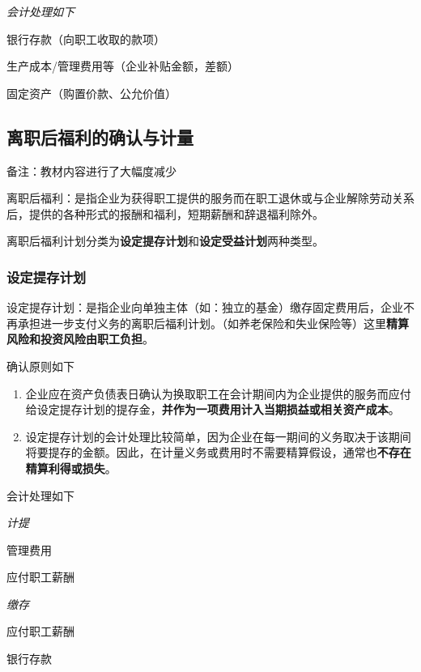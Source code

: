 \documentclass[UTF8,12pt]{ctexart}
\newenvironment{Dr}{%
	\begin{list}{}%
		{
			\setlength{\leftmargin}{2em}
			\setlength{\labelwidth}{2em}
			\setlength{\labelsep}{0pt}
			\setlength{\itemindent}{0pt}
			\setlength{\listparindent}{0pt}
			\setlength{\parsep}{0pt}
			\setlength{\topsep}{0pt}
		}
		\item[\textbf{借：}]
	}{%
	\end{list}
}
\newenvironment{Cr}{%
	\begin{list}{}%
		{
			\setlength{\leftmargin}{3em}
			\setlength{\labelwidth}{2em}
			\setlength{\labelsep}{0pt}
			\setlength{\itemindent}{0pt}
			\setlength{\listparindent}{0pt}
			\setlength{\parsep}{0pt}
			\setlength{\topsep}{0pt}
		}
		\item[\textbf{贷：}]
	}{%
	\end{list}
}
\numberwithin{equation}{section} %
\numberwithin{figure}{section}
\numberwithin{table}{section}
\begin{document}
	\textit{会计处理如下}
	
	\begin{Dr}
		银行存款（向职工收取的款项）
		
		生产成本/管理费用等（企业补贴金额，差额） 
	\end{Dr}
	\begin{Cr}
		固定资产（购置价款、公允价值）
	\end{Cr}
	
	\subsection{离职后福利的确认与计量}
	备注：教材内容进行了大幅度减少
	
	离职后福利：是指企业为获得职工提供的服务而在职工退休或与企业解除劳动关系后，提供的各种形式的报酬和福利，短期薪酬和辞退福利除外。
	
	离职后福利计划分类为\textbf{设定提存计划}和\textbf{设定受益计划}两种类型。
	
	\subsubsection{设定提存计划}
	设定提存计划：是指企业向单独主体（如：独立的基金）缴存固定费用后，企业不再承担进一步支付义务的离职后福利计划。（如养老保险和失业保险等）这里\textbf{精算风险和投资风险由职工负担}。
	
	确认原则如下
	\begin{enumerate}
		\item 企业应在资产负债表日确认为换取职工在会计期间内为企业提供的服务而应付给设定提存计划的提存金，\textbf{并作为一项费用计入当期损益或相关资产成本}。
		
		\item 设定提存计划的会计处理比较简单，因为企业在每一期间的义务取决于该期间将要提存的金额。因此，在计量义务或费用时不需要精算假设，通常也\textbf{不存在精算利得或损失}。
	\end{enumerate}
	
	会计处理如下
	
	\textit{计提}
	
	\begin{Dr}
		管理费用
	\end{Dr}
	\begin{Cr}
		应付职工薪酬
	\end{Cr}

	\textit{缴存}

	\begin{Dr}
		应付职工薪酬
	\end{Dr}
	\begin{Cr}
		银行存款
	\end{Cr}
	
\end{document}
